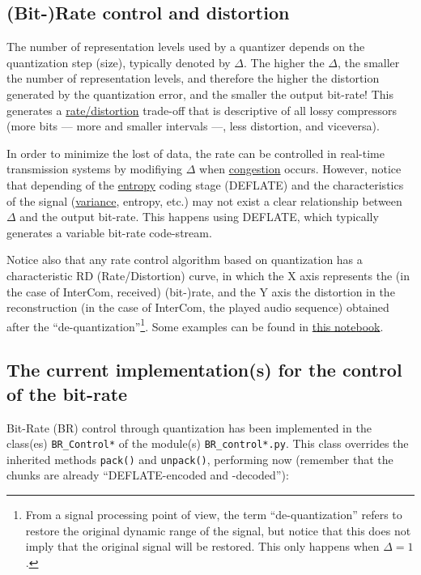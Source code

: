 \subsection{(Bit-)Rate control and distortion}
The number of representation levels used by a quantizer depends on the
quantization step (size), typically denoted by $\Delta$. The higher
the $\Delta$, the smaller the number of representation levels, and
therefore the higher the distortion generated by the quantization
error, and the smaller the output bit-rate! This generates a
\href{https://en.wikipedia.org/wiki/Rate%E2%80%93distortion_theory}{rate/distortion}
  trade-off that is descriptive of all lossy compressors (more bits
  --- more and smaller intervals ---, less distortion, and viceversa).

In order to minimize the lost of data, the rate can be controlled in
real-time transmission systems by modifiying $\Delta$ when
\href{https://en.wikipedia.org/wiki/Network_congestion}{congestion}
occurs. However, notice that depending of the
\href{https://en.wikipedia.org/wiki/Entropy_(information_theory)}{entropy}
coding stage (DEFLATE) and the characteristics of the signal
(\href{https://en.wikipedia.org/wiki/Variance}{variance}, entropy,
etc.) may not exist a clear relationship between $\Delta$ and the
output bit-rate. This happens using DEFLATE, which typically generates
a variable bit-rate code-stream.

Notice also that any rate control algorithm based on quantization has
a characteristic RD (Rate/Distortion) curve, in which the X axis
represents the (in the case of InterCom, received) (bit-)rate, and the Y
axis the distortion in the reconstruction (in the case of InterCom,
the played audio sequence) obtained after the
``de-quantization''\footnote{From a signal processing point of view,
  the term ``de-quantization'' refers to restore the original dynamic
  range of the signal, but notice that this does not imply that the
  original signal will be restored. This only happens when
  $\Delta=1$.}. Some examples can be found in
\href{https://github.com/Tecnologias-multimedia/Tecnologias-multimedia.github.io/blob/master/contents/BR_control/audio_quantization.ipynb}{this
  notebook}.

\subsection{The current implementation(s) for the control of the bit-rate}
Bit-Rate (BR) control through quantization has been implemented in the
class(es) \verb|BR_Control*| of the module(s) \texttt{BR\_control*.py}. This
class overrides the inherited methods \verb|pack()| and
\verb|unpack()|, performing now (remember that the chunks are already
``DEFLATE-encoded and -decoded''):

